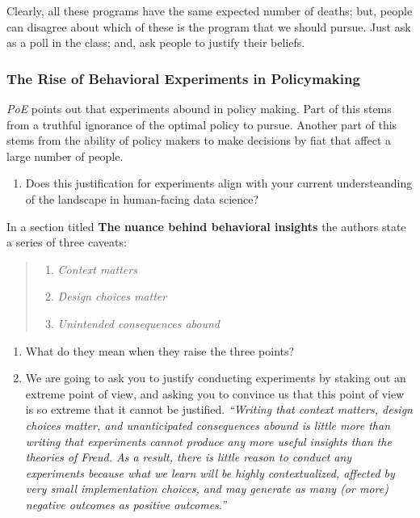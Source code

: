 \documentclass[
]{article}
\providecommand{\tightlist}{%
  \setlength{\itemsep}{0pt}\setlength{\parskip}{0pt}}
\begin{document}
Clearly, all these programs have the same expected number of deaths; but, people can disagree about which of these is the program that we should pursue. Just ask as a poll in the class; and, ask people to justify their beliefs.

\hypertarget{the-rise-of-behavioral-experiments-in-policymaking}{%
\subsubsection{The Rise of Behavioral Experiments in Policymaking}\label{the-rise-of-behavioral-experiments-in-policymaking}}

\emph{PoE} points out that experiments abound in policy making. Part of this stems from a truthful ignorance of the optimal policy to pursue. Another part of this stems from the ability of policy makers to make decisions by fiat that affect a large number of people.

\begin{enumerate}
\def\labelenumi{\arabic{enumi}.}
\tightlist
\item
  Does this justification for experiments align with your current understeanding of the landscape in human-facing data science?
\end{enumerate}

In a section titled \textbf{The nuance behind behavioral insights} the authors state a series of three caveats:

\begin{quote}
\begin{enumerate}
\def\labelenumi{\arabic{enumi}.}
\tightlist
\item
  \emph{Context matters}
\item
  \emph{Design choices matter}
\item
  \emph{Unintended consequences abound}
\end{enumerate}
\end{quote}

\begin{enumerate}
\def\labelenumi{\arabic{enumi}.}
\tightlist
\item
  What do they mean when they raise the three points?
\item
  We are going to ask you to justify conducting experiments by staking out an extreme point of view, and asking you to convince us that this point of view is so extreme that it cannot be justified. \emph{``Writing that context matters, design choices matter, and unanticipated consequences abound is little more than writing that experiments cannot produce any more useful insights than the theories of Freud. As a result, there is little reason to conduct any experiments because what we learn will be highly contextualized, affected by very small implementation choices, and may generate as many (or more) negative outcomes as positive outcomes.''}
\end{enumerate}
\end{document}

